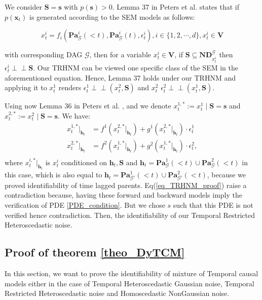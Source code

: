 We consider $\boldsymbol{S}=\boldsymbol{s}$ with $p(\boldsymbol{s})>0$. Lemma 37 in Peters et al. \citep{peters2014causal} states that if $p(\boldsymbol{x}_t)$ is generated according to the SEM models as follows:

$$
x^i_t=f_i\left(\mathbf{P a}_{\mathcal{G}}^i(<t), \mathbf{P a}_{\mathcal{G}}^i(t), \epsilon^i_t\right), i\in \{1,2, \cdots, d\}, x^i_t \in \boldsymbol{V}
$$

with corresponding DAG $\mathcal{G}$, then for a variable $x^i_t \in \boldsymbol{V}$, if $\boldsymbol{S} \subseteq \mathbf{N D}_{x^i_t}^{\mathcal{G}}$ then $\epsilon^i_t \perp\!\!\!\perp \boldsymbol{S}$. Our TRHNM can be viewed one specific class of the SEM in the aforementioned equation. Hence, Lemma 37 holds under our TRHNM and applying it to $x_t^1$ renders $\epsilon_t^1 \perp\!\!\!\perp (x_t^2, \boldsymbol{S})$ and $x_t^2$ $\epsilon_t^2 \perp\!\!\!\perp (x_t^1, \boldsymbol{S})$.

Using now Lemma 36 in Peters et al. \citep{peters2014causal}, and we denote $x_t^{1,*}:=x_t^1 \mid \boldsymbol{S}=\boldsymbol{s}$ and $x_t^{2,*}:=x_t^2 \mid \boldsymbol{S}=\boldsymbol{s}$. We have:
\begin{equation}
\begin{aligned}
    x_t^{1,*}|_{\boldsymbol{h}_t}&= f^1\left( x_t^{2,*}|_{\boldsymbol{h}_t}\right)+g^1\left( x_t^{2,*}|_{\boldsymbol{h}_t}\right)\cdot\epsilon_t^{1}\\
    x_t^{2,*}|_{\boldsymbol{h}_t}&= f^2\left( x_t^{1,*}|_{\boldsymbol{h}_t}\right)+g^2\left( x_t^{1,*}|_{\boldsymbol{h}_t}\right)\cdot\epsilon_t^{2},\\
\end{aligned} 
\label{eq_TRHNM_proof}
\end{equation} 
where $x_t^{i,*}|_{\boldsymbol{h}_t}$ is $x_t^i$ conditioned on $\boldsymbol{h}_t, \boldsymbol{S}$ and $\boldsymbol{h}_t = \mathbf{P a}_{\mathcal{G}}^1(<t) \cup \mathbf{P a}_{\mathcal{G}}^2(<t)$ in this case, which is also equal to $\boldsymbol{h}_t = \mathbf{P a}_{\mathcal{G}'}^1(<t) \cup \mathbf{P a}_{\mathcal{G}'}^2(<t)$, because we proved identifiability of time lagged parents.
Eq(\ref{eq_TRHNM_proof}) raise a contradiction because, having these forward and backward models imply the verification of PDE \ref{PDE_condition}. But we chose $s$ such that this PDE is not verified hence contradiction. Then, the identifiability of our Temporal Restricted Heteroscedastic noise.
\subsection{Proof of theorem \ref{theo_DyTCM}}
In this section, we want to prove the identifiability of mixture of Temporal causal models either in the case of Temporal Heteroscedastic Gaussian noise, Temporal Restricted Heteroscedastic noise and Homoscedastic NonGaussian noise.

